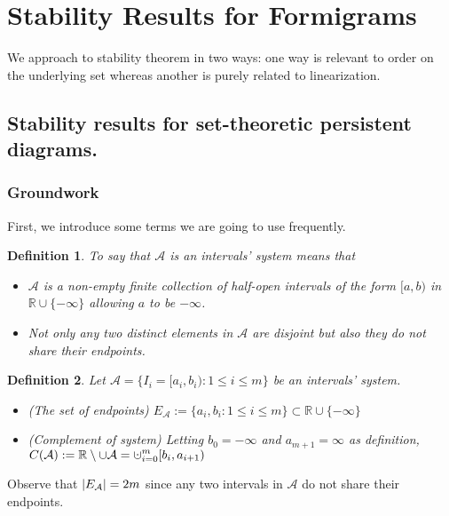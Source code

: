 \documentclass[a4paper,12pt]{article}
\newtheorem{definition}{Definition}[section]
\newcommand{\dotcup}{\ensuremath{\mathaccent\cdot\cup}}
\DeclarePairedDelimiter{\abs}{\lvert}{\rvert}
\begin{document}
\section{Stability Results for Formigrams}

We approach to stability theorem in two ways: one way is relevant to order on the underlying set whereas another is purely related to linearization.

\subsection{Stability results for set-theoretic persistent diagrams.}

\subsubsection{Groundwork}

First, we introduce some terms we are going to use frequently.
\begin{definition}
To say that $\mathcal{A}$ is an intervals' system means that 
\begin{itemize}
\item $\mathcal{A}$ is a non-empty finite collection of half-open intervals of the form $[a,b)$ in $\mathbb{R}\cup \{-\infty\}$ allowing $a$ to be $-\infty$. 

\item Not only any two distinct elements in $\mathcal{A}$ are disjoint but also they do not share their endpoints.
\end{itemize}
\end{definition}


\begin{definition} Let $\mathcal{A}=\{I_i=[a_i,b_i):  1\leq i \leq m\}$ be an intervals' system. \label{interval}

\begin{itemize}
\item (The set of endpoints) $E_\mathcal{A}:= \{a_i, b_i: 1\leq i \leq m\}\subset \mathbb{R}\cup \{-\infty\}$

\item (Complement of system) Letting $b_0=-\infty$ and $a_{m+1}=\infty$ as definition,  $\displaystyle C(\mathcal{A}):=\mathbb{R}\setminus \cup \mathcal{A}=\dotcup_{i=0}^m[b_i,a_{i+1})$ 
\end{itemize}
\end{definition}
Observe that $\abs{E_\mathcal{A}}=2m$ since  any two intervals in $\mathcal{A}$ do not share their endpoints. 
\end{document}

